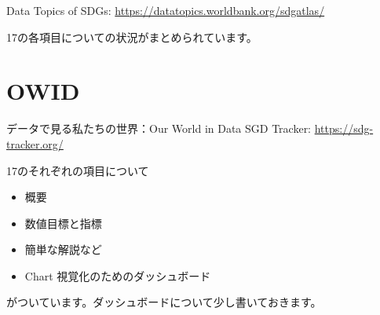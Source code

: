 \documentclass[
  xelatex, ja=standard]{bxjsbook}
\theoremstyle{definition}
\theoremstyle{definition}
\theoremstyle{definition}
\theoremstyle{definition}
\theoremstyle{remark}
\begin{document}
Data Topics of SDGs: \url{https://datatopics.worldbank.org/sdgatlas/}

17の各項目についての状況がまとめられています。

\hypertarget{owid}{%
\section{OWID}\label{owid}}

データで見る私たちの世界：Our World in Data SGD Tracker: \url{https://sdg-tracker.org/}

17のそれぞれの項目について

\begin{itemize}
\item
  概要
\item
  数値目標と指標
\item
  簡単な解説など
\item
  Chart 視覚化のためのダッシュボード
\end{itemize}

がついています。ダッシュボードについて少し書いておきます。
\end{document}
